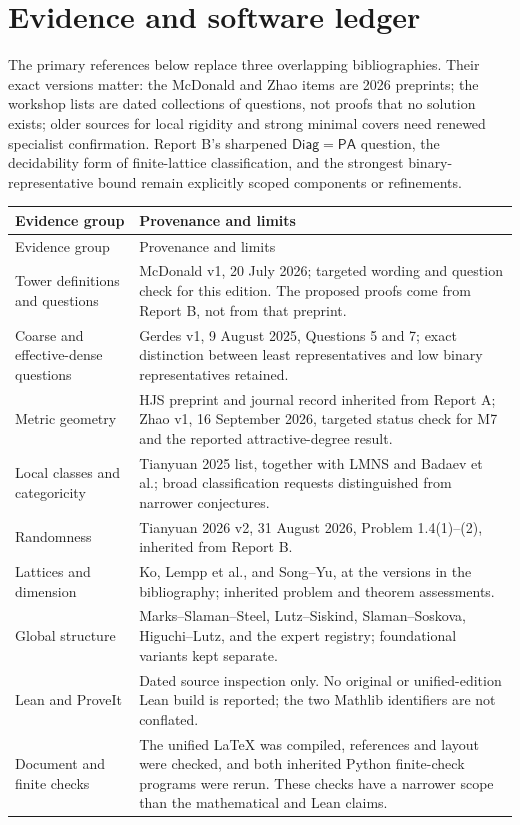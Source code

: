 \documentclass[11pt,a4paper]{article}
\newcommand{\PA}{\mathsf{PA}}\newcommand{\DNR}{\mathsf{DNR}}
\newcommand{\Diag}{\mathsf{Diag}}\newcommand{\IG}{\mathsf{IG}}
\theoremstyle{definition}\newtheorem{definition}[theorem]{Definition}
\theoremstyle{remark}\newtheorem{remark}[theorem]{Remark}
\begin{document}
\section{Evidence and software ledger}
\label{app:evidence}
The primary references below replace three overlapping bibliographies. Their exact versions matter: the McDonald and Zhao items are 2026 preprints; the workshop lists are dated collections of questions, not proofs that no solution exists; older sources for local rigidity and strong minimal covers need renewed specialist confirmation. Report B's sharpened $\Diag=\PA$ question, the decidability form of finite-lattice classification, and the strongest binary-representative bound remain explicitly scoped components or refinements.

\begin{longtable}{@{}p{}p{}@{}}
\toprule Evidence group & Provenance and limits \\\midrule
\endfirsthead
\toprule Evidence group & Provenance and limits \\\midrule
\endhead
\bottomrule\endfoot
Tower definitions and questions & McDonald v1, 20 July 2026; targeted wording and question check for this edition. The proposed proofs come from Report B, not from that preprint. \\
Coarse and effective-dense questions & Gerdes v1, 9 August 2025, Questions 5 and 7; exact distinction between least representatives and low binary representatives retained. \\
Metric geometry & HJS preprint and journal record inherited from Report A; Zhao v1, 16 September 2026, targeted status check for M7 and the reported attractive-degree result. \\
Local classes and categoricity & Tianyuan 2025 list, together with LMNS and Badaev et al.; broad classification requests distinguished from narrower conjectures. \\
Randomness & Tianyuan 2026 v2, 31 August 2026, Problem 1.4(1)--(2), inherited from Report B. \\
Lattices and dimension & Ko, Lempp et al., and Song--Yu, at the versions in the bibliography; inherited problem and theorem assessments. \\
Global structure & Marks--Slaman--Steel, Lutz--Siskind, Slaman--Soskova, Higuchi--Lutz, and the expert registry; foundational variants kept separate. \\
Lean and ProveIt & Dated source inspection only. No original or unified-edition Lean build is reported; the two Mathlib identifiers are not conflated. \\
Document and finite checks & The unified LaTeX was compiled, references and layout were checked, and both inherited Python finite-check programs were rerun. These checks have a narrower scope than the mathematical and Lean claims. \\
\end{longtable}
\end{document}

